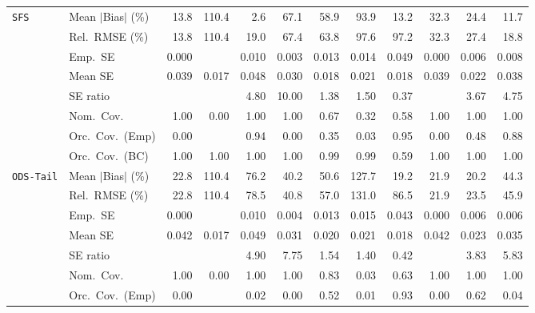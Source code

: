 \begin{landscape}
\begin{longtable}{llrrrrrrrrrr}
\addlinespace[2pt]
\quad \texttt{SFS} & Mean $|$Bias$|$ (\%) & 13.8 & 110.4 & \cellcolor{rankone}2.6 & 67.1 & 58.9 & 93.9 & \cellcolor{rankthree}13.2 & 32.3 & 24.4 & \cellcolor{ranktwo}11.7 \\
 & Rel.\ RMSE (\%) & \cellcolor{rankone}13.8 & 110.4 & \cellcolor{rankthree}19.0 & 67.4 & 63.8 & 97.6 & 97.2 & 32.3 & 27.4 & \cellcolor{ranktwo}18.8 \\
 & Emp.\ SE & 0.000 &  & 0.010 & 0.003 & 0.013 & 0.014 & 0.049 & 0.000 & 0.006 & 0.008 \\
 & Mean SE & 0.039 & 0.017 & 0.048 & 0.030 & 0.018 & 0.021 & 0.018 & 0.039 & 0.022 & 0.038 \\
 & SE ratio &  &  & 4.80 & 10.00 & \cellcolor{rankone}1.38 & \cellcolor{ranktwo}1.50 & \cellcolor{rankthree}0.37 &  & 3.67 & 4.75 \\
 & Nom.\ Cov. & \cellcolor{rankone}1.00 & 0.00 & \cellcolor{ranktwo}1.00 & \cellcolor{rankthree}1.00 & 0.67 & 0.32 & 0.58 & 1.00 & 1.00 & 1.00 \\
 & Orc.\ Cov.\ (Emp) & 0.00 &  & \cellcolor{ranktwo}0.94 & 0.00 & 0.35 & 0.03 & \cellcolor{rankone}0.95 & 0.00 & 0.48 & \cellcolor{rankthree}0.88 \\
 & Orc.\ Cov.\ (BC) & \cellcolor{rankthree}1.00 & 1.00 & 1.00 & 1.00 & \cellcolor{ranktwo}0.99 & \cellcolor{rankone}0.99 & 0.59 & 1.00 & 1.00 & 1.00 \\
\addlinespace[2pt]
\quad \texttt{ODS-Tail} & Mean $|$Bias$|$ (\%) & 22.8 & 110.4 & 76.2 & 40.2 & 50.6 & 127.7 & \cellcolor{rankone}19.2 & \cellcolor{rankthree}21.9 & \cellcolor{ranktwo}20.2 & 44.3 \\
 & Rel.\ RMSE (\%) & \cellcolor{ranktwo}22.8 & 110.4 & 78.5 & 40.8 & 57.0 & 131.0 & 86.5 & \cellcolor{rankone}21.9 & \cellcolor{rankthree}23.5 & 45.9 \\
 & Emp.\ SE & 0.000 &  & 0.010 & 0.004 & 0.013 & 0.015 & 0.043 & 0.000 & 0.006 & 0.006 \\
 & Mean SE & 0.042 & 0.017 & 0.049 & 0.031 & 0.020 & 0.021 & 0.018 & 0.042 & 0.023 & 0.035 \\
 & SE ratio &  &  & 4.90 & 7.75 & \cellcolor{ranktwo}1.54 & \cellcolor{rankone}1.40 & \cellcolor{rankthree}0.42 &  & 3.83 & 5.83 \\
 & Nom.\ Cov. & \cellcolor{rankone}1.00 & 0.00 & \cellcolor{ranktwo}1.00 & \cellcolor{rankthree}1.00 & 0.83 & 0.03 & 0.63 & 1.00 & 1.00 & 1.00 \\
 & Orc.\ Cov.\ (Emp) & 0.00 &  & 0.02 & 0.00 & \cellcolor{rankthree}0.52 & 0.01 & \cellcolor{rankone}0.93 & 0.00 & \cellcolor{ranktwo}0.62 & 0.04 \\

\end{longtable}
\end{landscape}
